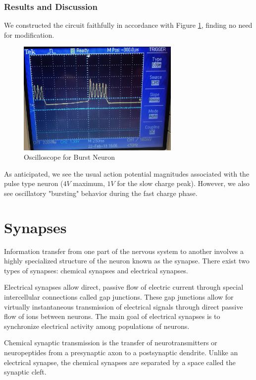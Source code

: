 \documentclass[12]{book}
\newcommand\0{\mathbf{0}}
\newcommand\<{\langle}
\renewcommand\>{\rangle}
\begin{document}
\subsection{Results and Discussion}

We constructed the circuit faithfully in accordance with Figure \ref{fig:maeda-burst}, finding no need for modification.

\begin{figure}[H]
\label{fig:maeda-burst}
\centering
\includegraphics[width=0.7\textwidth]{burster_osc}
\caption{Oscilloscope for Burst Neuron}
\end{figure}

As anticipated, we see the usual action potential magnitudes associated with the pulse type neuron ($4V$ maximum, $1V$ for the slow charge peak). However, we also see oscillatory "bursting" behavior during the fast charge phase.

\chapter{Synapses}

Information transfer from one part of the nervous system to another involves a highly specialized structure of the neuron known as the synapse. There exist two types of synapses: chemical synapses and electrical synapses. 

Electrical synapses allow direct, passive flow of electric current through special intercellular connections called gap junctions. These gap junctions allow for virtually instantaneous transmission of electrical signals through direct passive flow of ions between neurons. The main goal of electrical synapses is to synchronize electrical activity among populations of neurons. 

Chemical synaptic transmission is the transfer of neurotransmitters or neuropeptides from a presynaptic axon to a postsynaptic dendrite. Unlike an electrical synapse, the chemical synapses are separated by a space called the synaptic cleft.
\end{document}
